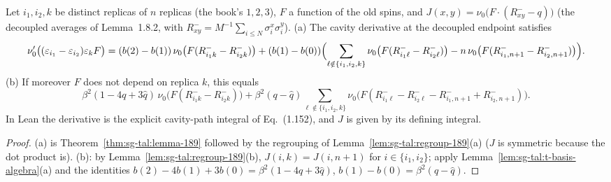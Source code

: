 \begin{theorem}
\label{thm:sg-tal:lemma-189-displayed}
  \leanok
{}
Let $i_1,i_2,k$ be distinct replicas of $n$ replicas (the book's $1,2,3$), $F$ a function of the old spins, and
$J(x,y)=\nu_0\bigl(F\cdot(R^-_{xy}-q)\bigr)$ (the decoupled averages of Lemma~1.8.2, with
$R^-_{xy}=M^{-1}\sum_{i\le N}\sigma^x_i\sigma^y_i$).
(a) The cavity derivative at the decoupled endpoint satisfies
$$\nu_0'\bigl((\varepsilon_{i_1}-\varepsilon_{i_2})\varepsilon_kF\bigr)=(b(2)-b(1))\,\nu_0\bigl(F(R^-_{i_1k}-R^-_{i_2k})\bigr)
+(b(1)-b(0))\Bigl(\sum_{\ell\notin\{i_1,i_2,k\}}\nu_0\bigl(F(R^-_{i_1\ell}-R^-_{i_2\ell})\bigr)
-n\,\nu_0\bigl(F(R^-_{i_1,n+1}-R^-_{i_2,n+1})\bigr)\Bigr).$$
(b) If moreover $F$ does not depend on replica $k$, this equals
$$\beta^2(1-4q+3\hat q)\,\nu_0\bigl(F(R^-_{i_1k}-R^-_{i_2k})\bigr)+\beta^2(q-\hat q)\sum_{\ell\notin\{i_1,i_2,k\}}
\nu_0\bigl(F(R^-_{i_1\ell}-R^-_{i_2\ell}-R^-_{i_1,n+1}+R^-_{i_2,n+1})\bigr).$$
In Lean the derivative is the explicit cavity-path integral of Eq.~(1.152), and $J$ is given by its
defining integral.
\end{theorem}
\begin{proof}
  \leanok
(a) is Theorem~\ref{thm:sg-tal:lemma-189} followed by the regrouping of Lemma~\ref{lem:sg-tal:regroup-189}(a)
($J$ is symmetric because the dot product is).  (b): by Lemma~\ref{lem:sg-tal:regroup-189}(b),
$J(i,k)=J(i,n+1)$ for $i\in\{i_1,i_2\}$; apply Lemma~\ref{lem:sg-tal:t-basis-algebra}(a) and the identities
$b(2)-4b(1)+3b(0)=\beta^2(1-4q+3\hat q)$, $b(1)-b(0)=\beta^2(q-\hat q)$.
\end{proof}

